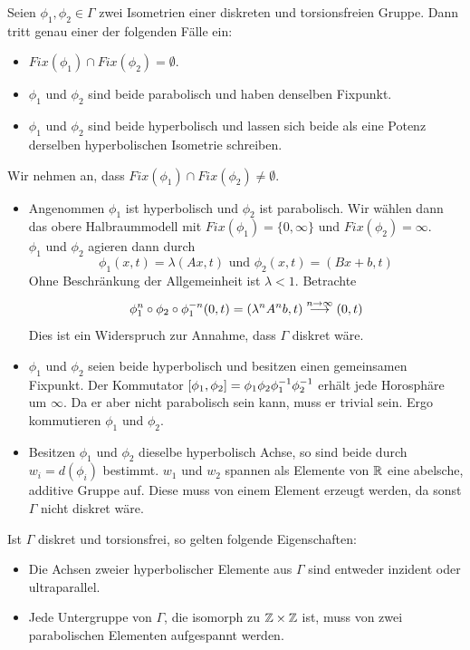 \documentclass{book}
\begin{document}
\Lem{}
\label{Lemma 422}
Seien $\phi_1, \phi_2 \in \Gamma$ zwei Isometrien einer diskreten und torsionsfreien Gruppe. Dann tritt genau einer der folgenden Fälle ein:
\begin{itemize}
	\item $Fix(\phi_1) \cap Fix(\phi_2) = \emptyset$.
	\item $\phi_1$ und $\phi_2$ sind beide parabolisch und haben denselben Fixpunkt.
	\item $\phi_1$ und $\phi_2$ sind beide hyperbolisch und lassen sich beide als eine Potenz derselben hyperbolischen Isometrie schreiben.
\end{itemize}
\begin{Beweis}{}
	Wir nehmen an, dass $Fix(\phi_1) \cap Fix(\phi_2) \neq \emptyset$.
\begin{itemize}
	\item Angenommen $\phi_1$ ist hyperbolisch und $\phi_2$ ist parabolisch. Wir wählen dann das obere Halbraummodell mit $Fix(\phi_1) = \{0, \infty\}$ und $Fix(\phi_2) = \infty$.\\
	$\phi_1$ und $\phi_2$ agieren dann durch
	\[ \phi_1(x,t) = \lambda(Ax, t) \text{ und } \phi_2(x,t) = (Bx + b, t) \]
	Ohne Beschränkung der Allgemeinheit ist $\lambda < 1$. Betrachte
	\[ \phi_1^n\circ \phi_2 \circ \phi_1^{-n}(0,t) = (\lambda^n A^nb, t) \overset{n \overset{}{\rightarrow} \infty}{\longrightarrow} (0,t) \]
	Dies ist ein Widerspruch zur Annahme, dass $\Gamma$ diskret wäre.
	\item $\phi_1$ und $\phi_2$ seien beide hyperbolisch und besitzen einen gemeinsamen Fixpunkt. Der Kommutator $[\phi_1, \phi_2] = \phi_1\phi_2 \phi_1^{-1} \phi_2^{-1}$ erhält jede Horosphäre um $\infty$. Da er aber nicht parabolisch sein kann, muss er trivial sein. Ergo kommutieren $\phi_1$ und $\phi_2$.
	\item Besitzen $\phi_1$ und $\phi_2$ dieselbe hyperbolisch Achse, so sind beide durch $w_i = d(\phi_i)$ bestimmt. $w_1$ und $w_2$ spannen als Elemente von $\mathbb{R}$ eine abelsche, additive Gruppe auf. Diese muss von einem Element erzeugt werden, da sonst $\Gamma$ nicht diskret wäre.
\end{itemize}
\end{Beweis}

\Kor{}
Ist $\Gamma$ diskret und torsionsfrei, so gelten folgende Eigenschaften:
\begin{itemize}
	\item Die Achsen zweier hyperbolischer Elemente aus $\Gamma$ sind entweder inzident oder ultraparallel.
	\item Jede Untergruppe von $\Gamma$, die isomorph zu $\mathbb{Z}\times \mathbb{Z}$ ist, muss von zwei parabolischen Elementen aufgespannt werden.
\end{itemize}
\end{document}
